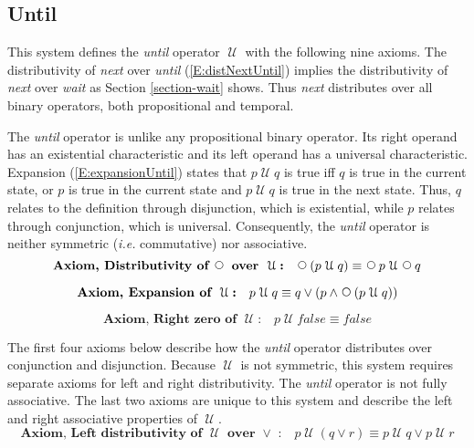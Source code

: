 \documentclass[12pt, fleqn, leqno]{article}
\newcommand{\Until}{\;\mathcal{U}\;}
\newcommand{\Next}{\;\,\text{\raisebox{3.5pt}{\circle{6}}}}
\newcommand{\firstspacer}{\vspace{-26pt}}
\begin{document}

\subsection{Until}\label{section-until}

This system defines the \textit{until} operator $\Until$ with the following nine axioms.
The distributivity of \textit{next} over \textit{until} (\ref{E:distNextUntil}) implies the distributivity of \textit{next} over \textit{wait} as Section \ref{section-wait} shows.
Thus \textit{next} distributes over all binary operators, both propositional and temporal.

The \textit{until} operator is unlike any propositional binary operator.
Its right operand has an existential characteristic and its left operand has a universal characteristic.
Expansion (\ref{E:expansionUntil}) states that
$p\Until q$ is true iff $q$ is true in the current state, or $p$ is true in the current state and $p\Until q$ is
true in the next state.
Thus, $q$ relates to the definition through disjunction, which is existential,
while $p$ relates through conjunction, which is universal.
Consequently, the \textit{until} operator is neither symmetric (\textit{i.e.} commutative) nor associative.
\begin{equation}\label{E:distNextUntil}
\textbf{Axiom, Distributivity of $\Next$ over $\Until$:}\quad \Next (p \Until q) \equiv \Next p \Until \Next q
\end{equation}

\firstspacer

\begin{equation}\label{E:expansionUntil}
\textbf{Axiom, Expansion of $\Until$:}\quad p \Until q \equiv q \lor (p \land \Next (p \Until q))
\end{equation}

\firstspacer

\begin{equation}\label{E:untilFalse}
\textbf{Axiom, Right zero of $\Until$:}\quad p \Until false \equiv false
\end{equation}

The first four axioms below describe how the \textit{until} operator distributes over conjunction and disjunction.
Because $\Until$ is not symmetric, this system requires separate axioms for left and right distributivity.
The \textit{until} operator is not fully associative.
The last two axioms are unique to this system and describe the left and right associative properties of $\Until$.
\begin{equation}\label{E:untilOrEquiv}
\textbf{Axiom, Left distributivity of $\Until$ over $\lor$ :}\quad p \Until (q \lor r) \equiv p \Until q \lor p \Until r
\end{equation}
\end{document}
